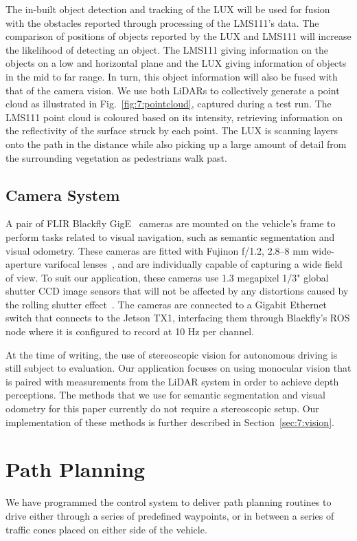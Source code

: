 The in-built object detection and tracking of the LUX will be used for fusion with the obstacles reported through processing of the LMS111's data. The comparison of positions of objects reported by the LUX and LMS111 will increase the likelihood of detecting an object. The LMS111 giving information on the objects on a low and horizontal plane and the LUX giving information of objects in the mid to far range. In turn, this object information will also be fused with that of the camera vision. 
We use both LiDARs to collectively generate a point cloud as illustrated in Fig.~\ref{fig:7:pointcloud}, captured during a test run. 
The LMS111 point cloud is coloured based on its intensity, retrieving information on the reflectivity of the surface struck by each point. The LUX is scanning layers onto the path in the distance while also picking up a large amount of detail from the surrounding vegetation as pedestrians walk past.

\subsection{Camera System}\label{sec:7:camera}
A pair of FLIR Blackfly GigE~\cite{flir_blackfly_nodate} cameras are mounted on the vehicle's frame to perform tasks related to visual navigation, such as semantic segmentation and visual odometry. These cameras are fitted with Fujinon f/1.2, 2.8--8 mm wide-aperture varifocal lenses~\cite{flir_fujinon_nodate}, and are individually capable of capturing a wide field of view. To suit our application, these cameras use 1.3 megapixel 1/3" global shutter CCD image sensors that will not be affected by any distortions caused by the rolling shutter effect~\cite{liang_analysis_2008}. The cameras are connected to a Gigabit Ethernet switch that connects to the Jetson TX1, interfacing them through Blackfly's ROS node where it is configured to record at 10 Hz per channel.


At the time of writing, the use of stereoscopic vision for autonomous driving is still subject to evaluation. Our application focuses on using monocular vision that is paired with measurements from the LiDAR system in order to achieve depth perceptions. The methods that we use for semantic segmentation and visual odometry for this paper currently do not require a stereoscopic setup. Our implementation of these methods is further described in Section~\ref{sec:7:vision}.

\section{Path Planning}\label{sec:7:path}
We have programmed the control system to deliver path planning routines to drive either through a series of predefined waypoints, or in between a series of traffic cones placed on either side of the vehicle.

